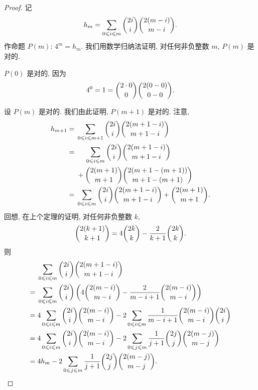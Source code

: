 \documentclass[../libro.tex]{subfiles}
\begin{document}
\begin{proof}
    记
    \begin{align*}
        h_m = \sum_{0 \leq i \leq m} {\dbinom{2i}{i} \dbinom{2(m-i)}{m-i}}.
    \end{align*}
    作命题 \(P(m)\): \(4^m = h_m\).
    我们用数学归纳法证明, 对任何非负整数 \(m\),
    \(P(m)\) 是对的.

    \(P(0)\) 是对的, 因为
    \begin{align*}
        4^0 = 1 = \dbinom{2 \cdot 0}{0} \dbinom{2 (0 - 0)}{0 - 0}.
    \end{align*}

    设 \(P(m)\) 是对的.
    我们由此证明, \(P(m+1)\) 是对的.
    注意,
    \begin{align*}
        h_{m+1}
        = {} &
        \sum_{0 \leq i \leq m+1} {\dbinom{2i}{i} \dbinom{2(m+1-i)}{m+1-i}}
        \\
        = {} &
        \hphantom{{} + {}}
        \sum_{0 \leq i \leq m} {\dbinom{2i}{i} \dbinom{2(m+1-i)}{m+1-i}}
        \\
        &
        {}
        + \dbinom{2(m+1)}{m+1} \dbinom{2(m+1-(m+1))}{m+1-(m+1)}
        \\
        = {} &
        \sum_{0 \leq i \leq m} {\dbinom{2i}{i} \dbinom{2(m+1-i)}{m+1-i}}
        + \dbinom{2(m+1)}{m+1}.
    \end{align*}
    回想, 在上个定理的证明, 对任何非负整数 \(k\),
    \begin{align*}
        \dbinom{2(k+1)}{k+1}
        = 4 \dbinom{2k}{k} - \frac{2}{k+1} \dbinom{2k}{k}.
    \end{align*}
    则
    \begin{align*}
        &
        \sum_{0 \leq i \leq m} {\dbinom{2i}{i} \dbinom{2(m+1-i)}{m+1-i}}
        \\
        = {} &
        \sum_{0 \leq i \leq m} {
            \dbinom{2i}{i}
            \left( 4 \dbinom{2(m-i)}{m-i} - \frac{2}{m-i+1} \dbinom{2(m-i)}{m-i} \right)
        }
        \\
        = {} &
        4 \sum_{0 \leq i \leq m} {\dbinom{2i}{i} \dbinom{2(m-i)}{m-i}}
        - 2 \sum_{0 \leq i \leq m} {\frac{1}{m-i+1} \dbinom{2(m-i)}{m-i} \dbinom{2i}{i}}
        \\
        = {} &
        4 \sum_{0 \leq i \leq m} {\dbinom{2i}{i} \dbinom{2(m-i)}{m-i}}
        - 2 \sum_{0 \leq j \leq m} {\frac{1}{j+1} \dbinom{2j}{j} \dbinom{2(m-j)}{m-j}}
        \\
        = {} &
        4 h_m
        - 2 \sum_{0 \leq j \leq m} {\frac{1}{j+1} \dbinom{2j}{j} \dbinom{2(m-j)}{m-j}}.

\end{align*}
\end{proof}
\end{document}
